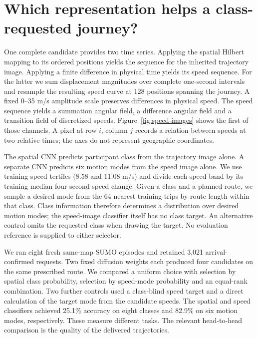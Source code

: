 \section{Which representation helps a class-requested journey?}
\label{sec:two-gafs}
One complete candidate provides two time series. Applying the spatial Hilbert mapping to its ordered positions yields the sequence for the inherited trajectory image. Applying a finite difference in physical time yields its speed sequence. For the latter we sum displacement magnitudes over complete one-second intervals and resample the resulting speed curve at 128 positions spanning the journey. A fixed 0--35 m/s amplitude scale preserves differences in physical speed. The speed sequence yields a summation angular field, a difference angular field and a transition field of discretized speeds. Figure~\ref{fig:speed-images} shows the first of those channels. A pixel at row $i$, column $j$ records a relation between speeds at two relative times; the axes do not represent geographic coordinates.


The spatial CNN predicts participant class from the trajectory image alone. A separate CNN predicts six motion modes from the speed image alone. We use training speed tertiles (8.58 and 11.08 m/s) and divide each speed band by its training median four-second speed change. Given a class and a planned route, we sample a desired mode from the 64 nearest training trips by route length within that class. Class information therefore determines a distribution over desired motion modes; the speed-image classifier itself has no class target. An alternative control omits the requested class when drawing the target. No evaluation reference is supplied to either selector.

We ran eight fresh same-map SUMO episodes and retained 3,021 arrival-confirmed requests. Two fixed diffusion weights each produced four candidates on the same prescribed route. We compared a uniform choice with selection by spatial class probability, selection by speed-mode probability and an equal-rank combination. Two further controls used a class-blind speed target and a direct calculation of the target mode from the candidate speeds. The spatial and speed classifiers achieved 25.1\% accuracy on eight classes and 82.9\% on six motion modes, respectively. These measure different tasks. The relevant head-to-head comparison is the quality of the delivered trajectories.

